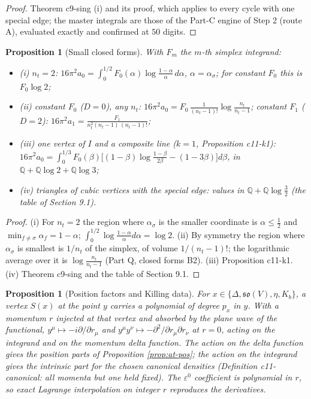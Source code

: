 \documentclass[11pt]{article}
\numberwithin{equation}{section}
\theoremstyle{plain}
\newtheorem{proposition}[theorem]{Proposition}
\theoremstyle{definition}
\begin{document}
\begin{proof}
Theorem c9-sing (i) and its proof, which applies to every cycle with one special edge; the master integrals are those of the Part-C engine of Step 2 (route A), evaluated exactly and confirmed at $50$ digits.
\end{proof}

\begin{proposition}[Small closed forms]
\label{prop:at-small}
With $F_m$ the $m$-th simplex integrand:
\begin{itemize}
\item (i) $n_t=2$: $16\pi^2a_0=\int_0^{1/2}F_0(\alpha)\log\frac{1-\alpha}\alpha\,d\alpha$, $\alpha=\alpha_\sigma$; for constant $F_0$ this is $F_0\log2$;
\item (ii) constant $F_0$ ($D=0$), any $n_t$: $16\pi^2a_0=F_0\,\frac{1}{(n_t-1)!}\log\frac{n_t}{n_t-1}$; constant $F_1$ ($D=2$): $16\pi^2a_1=\frac{F_1}{n_t^2(n_t-1)\,(n_t-1)!}$;
\item (iii) one vertex of $I$ and a composite line ($k=1$, Proposition c11-k1): $16\pi^2a_0=\int_0^{1/3}F_0(\beta)\big[(1-\beta)\log\frac{1-\beta}{2\beta}-(1-3\beta)\big]d\beta$, in $\mathbb Q+\mathbb Q\log2+\mathbb Q\log3$;
\item (iv) triangles of cubic vertices with the special edge: values in $\mathbb Q+\mathbb Q\log\tfrac32$ (the table of Section 9.1).
\end{itemize}
\end{proposition}

\begin{proof}
(i) For $n_t=2$ the region where $\alpha_\sigma$ is the smaller coordinate is $\alpha\le\tfrac12$ and $\min_{f\ne\sigma}\alpha_f=1-\alpha$; $\int_0^{1/2}\log\frac{1-\alpha}\alpha d\alpha=\log2$. (ii) By symmetry the region where $\alpha_\sigma$ is smallest is $1/n_t$ of the simplex, of volume $1/(n_t-1)!$; the logarithmic average over it is $\log\frac{n_t}{n_t-1}$ (Part Q, closed forms B2). (iii) Proposition c11-k1. (iv) Theorem c9-sing and the table of Section 9.1.
\end{proof}

\begin{proposition}[Position factors and Killing data]
\label{prop:at-inject}
For $x\in\{\Delta,\mathfrak{so}(V),\eta,K_b\}$, a vertex $S(x)$ at the point $y$ carries a polynomial of degree $p_x$ in $y$. With a momentum $r$ injected at that vertex and absorbed by the plane wave of the functional, $y^\mu\mapsto-i\partial/\partial r_\mu$ and $y^\mu y^\nu\mapsto-\partial^2/\partial r_\mu\partial r_\nu$ at $r=0$, acting on the integrand and on the momentum delta function. The action on the delta function gives the position parts of Proposition \ref{prop:at-pos}; the action on the integrand gives the intrinsic part for the chosen canonical densities (Definition c11-canonical: all momenta but one held fixed). The $\varepsilon^0$ coefficient is polynomial in $r$, so exact Lagrange interpolation on integer $r$ reproduces the derivatives.
\end{proposition}
\end{document}
